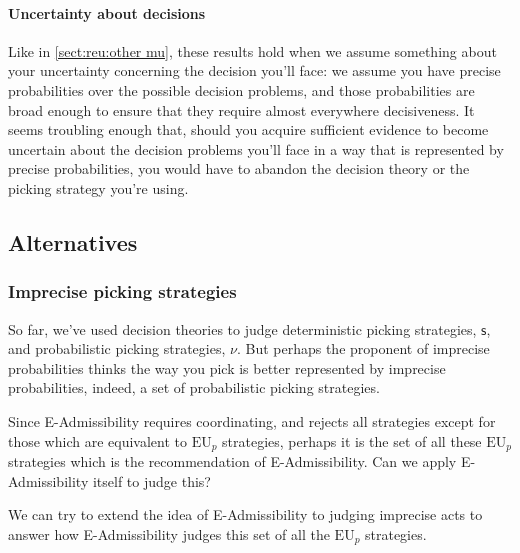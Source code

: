 \documentclass[a4paper]{article}
\newcommand\s{\mathsf{s}}
\renewcommand\c{\mathsf{c}} %
\newcommand\EU{\mathrm{EU}}
\renewcommand{\color}[1]{}
\newenvironment{CCM rewritten}
{\begingroup\color{blue}} %
{\endgroup}              %
\begin{document}
{
	\paragraph{Uncertainty about decisions}
	Like in \cref{sect:reu:other mu}, these results hold when we assume something about your uncertainty concerning the decision you'll face: we assume you have precise probabilities over the possible decision problems, and those probabilities are broad enough to ensure that they require almost everywhere decisiveness. It seems troubling enough that, should you acquire sufficient evidence to become uncertain about the decision problems you'll face in a way that is represented by precise probabilities, you would have to abandon the decision theory or the picking strategy you're using. 
}

	
	\subsection{Alternatives}
	
	\subsubsection{Imprecise picking strategies}\label{IPpicking}
	So far, we've used decision theories to judge deterministic picking strategies, $\s$, and probabilistic picking strategies, $\nu$. 
	But perhaps the proponent of imprecise probabilities thinks the way you pick is better represented by imprecise probabilities, indeed, a set of probabilistic picking strategies. 
	
	{\color{blue}
	Since E-Admissibility requires coordinating, and rejects all strategies except for those which are equivalent to $\EU_p$ strategies, perhaps it is the set of all these $\EU_p$ strategies which is the recommendation of E-Admissibility. Can we apply E-Admissibility itself to judge this? 
	
	
	We can try to extend the idea of E-Admissibility to judging imprecise acts to answer how E-Admissibility judges this set of all the $\EU_p$ strategies. 
	}
	
\end{document}
